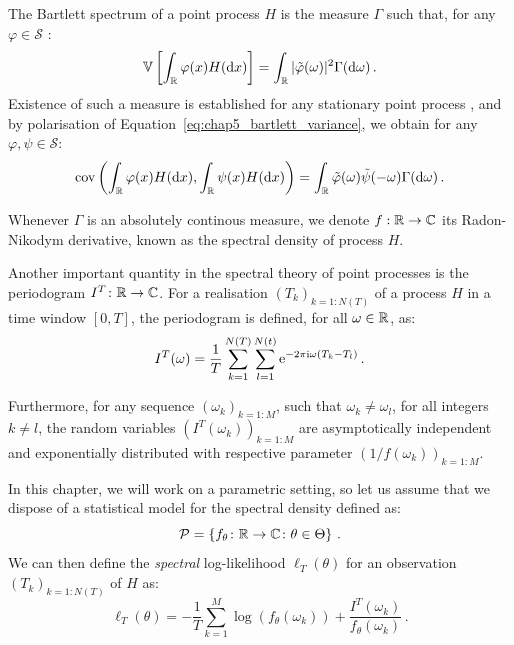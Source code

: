 The Bartlett spectrum of a point process $H$ is the measure $\Gamma$ such that, 
for any $\varphi\in\mathcal{S}$ \parencite[Definition 2]{Bremaud2005}:
\begin{equation}\label{eq:chap5_bartlett_variance}
    {\mathbb V}\left[\int_{{\mathbb R}}{\varphi(x)H({\mathrm{d}} x)}\right] = \int_{{\mathbb R}}{|\tilde\varphi(\omega)|^2\Gamma({\mathrm{d}} \omega)}\,.
\end{equation}
Existence of such a measure is established for any stationary point process \parencite[Proposition 8.2.I.(a)]{DaleyV1},
and by polarisation of Equation~\eqref{eq:chap5_bartlett_variance}, we obtain for any $\varphi, \psi \in \mathcal{S}$:
\begin{equation}\label{eq:chap5_bartlett_covariance}
    \operatorname{cov}\left(\int_{{\mathbb R}}{\varphi(x)H({\mathrm{d}} x)}, \int_{{\mathbb R}}{\psi(x)H({\mathrm{d}} x)}\right) = \int_{{\mathbb R}}{\tilde \varphi(\omega)\tilde \psi(-\omega)\Gamma({\mathrm{d}} \omega)}\,.
\end{equation}

Whenever $\Gamma$ is an absolutely continous measure, we denote $f:{\mathbb R}\to {\mathbb C}$ its Radon-Nikodym derivative, 
known as the spectral density of process $H$.

Another important quantity in the spectral theory of point processes is the periodogram $I^T\colon {\mathbb R} \to {\mathbb C}$.
For a realisation $(T_k)_{k=1:N(T)}$ of a process $H$ in a time window $[0,T]$, the periodogram is defined, for all $\omega\in{\mathbb R}$, as:
\[I^T(\omega) = \frac{1}{T}\sum_{k=1}^{N(T)}\sum_{l=1}^{N(t)}{\mathrm{e}^{-2\pi \mathrm{i} \omega (T_k - T_l)}}\,.\]

Furthermore, for any sequence $(\omega_k)_{k=1:M}$, such that $\omega_k \neq \omega_l$, for all integers $k\neq l$,
the random variables $(I^T(\omega_k))_{k=1:M}$ are asymptotically independent and exponentially distributed \parencite{Tuan1981} with respective parameter $(1/f(\omega_k))_{k=1:M}$.

In this chapter, we will work on a parametric setting, 
so let us assume that we dispose of a statistical model for the spectral density defined as:
\[
    \mathcal{P} = \left\{
        f_\theta \colon {\mathbb R} \to {\mathbb C} \colon \theta \in \Theta
    \right\}\,.
\]
We can then define the \textit{spectral} log-likelihood $\ell_T(\theta)$ for an observation $(T_k)_{k=1:N(T)}$ of $H$ as:
\begin{equation}\label{eq:chap5_spectral_ll}
    \ell_T(\theta) = -\frac{1}{T}\sum_{k=1}^{M}{\log(f_\theta (\omega_k)) + \frac{I^T(\omega_k)}{f_\theta(\omega_k)}}\,.
\end{equation}


